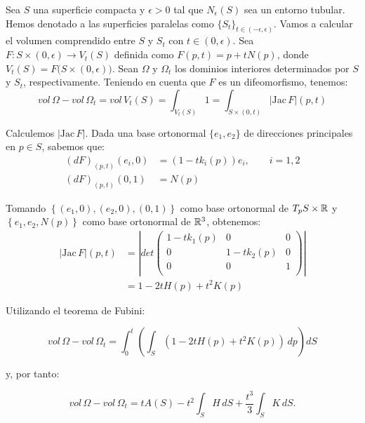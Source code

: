\begin{remark}
Sea $S$ una superficie compacta y $\epsilon > 0$ tal que $N_\epsilon(S)$ sea un entorno tubular. Hemos denotado a las superficies paralelas como $\{S_t\}_{t \in (-\epsilon, \epsilon)}$. Vamos a calcular el volumen comprendido entre $S$ y $S_t$ con $t\in (0, \epsilon)$. Sea $F: S \times (0, \epsilon) \longrightarrow V_t(S)$ definida como $F(p, t) = p + tN(p)$, donde $V_t(S)=F \big( S \times (0,\epsilon) \big)$. Sean $\Omega$ y $\Omega_t$ los dominios interiores determinados por $S$ y $S_t$, respectivamente. Teniendo en cuenta que $F$ es un difeomorfismo, tenemos:
%
\begin{equation*}
    vol \, \Omega - vol \, \Omega_t = vol \, V_t(S) = \int_{V_t(S)} 1 = \int_{S \times (0,t)} |\text{Jac} \, F|(p,t)
\end{equation*}

Calculemos $|\text{Jac} \, F|$. Dada una base ortonormal $\{e_1, e_2\}$ de direcciones principales en $p \in S$, sabemos que:
%
\begin{align*}
    (dF)_{(p,t)}(e_i,0) &= (1-tk_i(p))e_i, \qquad i = 1,2 \\
    (dF)_{(p,t)}(0,1) &= N(p)
\end{align*}

Tomando $\left\{(e_1,0), (e_2,0), (0,1)\right\}$ como base ortonormal de $T_pS \times \mathbb{R}$ y $\left\{e_1, e_2, N(p)\right\}$ como base ortonormal de $\mathbb{R}^3$, obtenemos:
%
\begin{align*}
    |\text{Jac} \, F|(p,t) &= \left|
  det \left( {\begin{array}{ccc}
   1 - tk_1(p) & 0 & 0 \\
   0 & 1-tk_2(p) & 0 \\
   0 & 0 & 1 \\
  \end{array} } \right) \right| \\
  &= 1 - 2tH(p) + t^2K(p)
\end{align*}

Utilizando el teorema de Fubini:

\begin{equation*}
    vol \, \Omega - vol \, \Omega_t = \int_0^t \left( \int_{S} \left( 1-2tH(p)+t^2K(p) \right) \, dp \right) dS
\end{equation*}

y, por tanto:

\begin{equation}\label{volumeparallelsurface}
    vol \, \Omega - vol \, \Omega_t = tA(S) - t^2\int_S H \, dS + \frac{t^3}{3}\int_S K \, dS.
\end{equation}
\end{remark}

